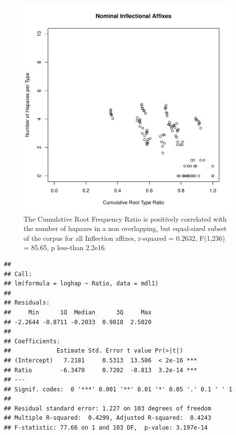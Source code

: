 \documentclass[12pt]{article}\usepackage[]{graphicx}\usepackage[]{color}
\makeatletter
\def\maxwidth{ %
  \ifdim\Gin@nat@width>\linewidth
    \linewidth
  \else
    \Gin@nat@width
  \fi
}
\newenvironment{kframe}{%
 \def\at@end@of@kframe{}%
 \ifinner\ifhmode%
  \def\at@end@of@kframe{\end{minipage}}%
  \begin{minipage}{\columnwidth}%
 \fi\fi%
 \def\FrameCommand##1{\hskip\@totalleftmargin \hskip-\fboxsep
 \colorbox{shadecolor}{##1}\hskip-\fboxsep
     \hskip-\linewidth \hskip-\@totalleftmargin \hskip\columnwidth}%
 \MakeFramed {\advance\hsize-\width
   \@totalleftmargin\z@ \linewidth\hsize
   \@setminipage}}%
 {\par\unskip\endMakeFramed%
 \at@end@of@kframe}
\newenvironment{knitrout}{}{} %
\makeatother
\begin{document}
\begin{knitrout}
\color{fgcolor}\begin{figure}
\includegraphics[width=\maxwidth]{figure/HapaxDataInflectionNom-1} \caption[The Cumulative Root Frequency Ratio is positively correlated with the number of hapaxes in a non overlapping, but equal-sized subset of the corpus for all Inflection affixes, r-squared = 0.2632, F(1,236) = 85.65, p less-than 2.2e16]{The Cumulative Root Frequency Ratio is positively correlated with the number of hapaxes in a non overlapping, but equal-sized subset of the corpus for all Inflection affixes, r-squared = 0.2632, F(1,236) = 85.65, p less-than 2.2e16.}\label{fig:HapaxDataInflectionNom}
\end{figure}

\begin{kframe}\begin{verbatim}
## 
## Call:
## lm(formula = loghap ~ Ratio, data = mdl1)
## 
## Residuals:
##     Min      1Q  Median      3Q     Max 
## -2.2644 -0.8711 -0.2033  0.9818  2.5020 
## 
## Coefficients:
##             Estimate Std. Error t value Pr(>|t|)    
## (Intercept)   7.2181     0.5313  13.586  < 2e-16 ***
## Ratio        -6.3470     0.7202  -8.813  3.2e-14 ***
## ---
## Signif. codes:  0 '***' 0.001 '**' 0.01 '*' 0.05 '.' 0.1 ' ' 1
## 
## Residual standard error: 1.227 on 103 degrees of freedom
## Multiple R-squared:  0.4299,	Adjusted R-squared:  0.4243 
## F-statistic: 77.66 on 1 and 103 DF,  p-value: 3.197e-14
\end{verbatim}
\end{kframe}
\end{knitrout}
\end{document}
